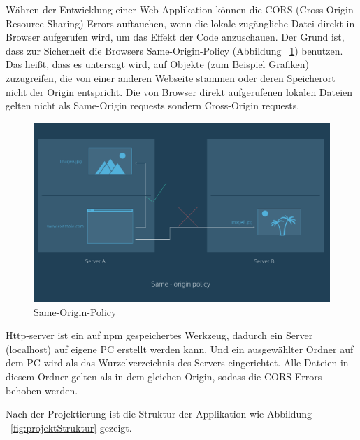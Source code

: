  Währen der Entwicklung einer Web Applikation können die CORS (Cross-Origin Resource Sharing) Errors auftauchen, wenn die lokale zugängliche Datei direkt in Browser aufgerufen wird, um das Effekt der Code anzuschauen. Der Grund ist, dass zur Sicherheit die Browsers Same-Origin-Policy (Abbildung ~\ref{fig:Same-Origin-Policy}) benutzen. Das heißt, dass es untersagt wird, auf Objekte (zum Beispiel Grafiken) zuzugreifen, die von einer anderen Webseite stammen oder deren Speicherort nicht der Origin entspricht. Die von Browser direkt aufgerufenen lokalen Dateien gelten nicht als Same-Origin requests sondern Cross-Origin requests.
 
\begin{figure}[ht]
\centering
\includegraphics[width=\textwidth]{images/sameOrigin.png}
\caption[Same-Origin-Policy]{Same-Origin-Policy}
\label{fig:Same-Origin-Policy}
\end{figure}
 
 Http-server ist ein auf npm gespeichertes Werkzeug, dadurch ein Server (localhost) auf eigene PC erstellt werden kann. Und ein ausgewählter Ordner auf dem PC wird als das Wurzelverzeichnis des Servers eingerichtet. Alle Dateien in diesem Ordner gelten als in dem gleichen Origin, sodass die CORS Errors behoben werden.
 
 Nach der Projektierung ist die Struktur der Applikation wie Abbildung ~\ref{fig:projektStruktur} gezeigt.
 
